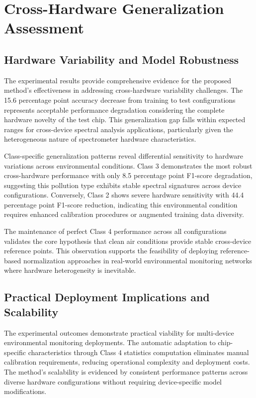 \section{Cross-Hardware Generalization Assessment}

\subsection{Hardware Variability and Model Robustness}

The experimental results provide comprehensive evidence for the proposed method's effectiveness in addressing cross-hardware variability challenges. The 15.6 percentage point accuracy decrease from training to test configurations represents acceptable performance degradation considering the complete hardware novelty of the test chip. This generalization gap falls within expected ranges for cross-device spectral analysis applications, particularly given the heterogeneous nature of spectrometer hardware characteristics.

Class-specific generalization patterns reveal differential sensitivity to hardware variations across environmental conditions. Class 3 demonstrates the most robust cross-hardware performance with only 8.5 percentage point F1-score degradation, suggesting this pollution type exhibits stable spectral signatures across device configurations. Conversely, Class 2 shows severe hardware sensitivity with 44.4 percentage point F1-score reduction, indicating this environmental condition requires enhanced calibration procedures or augmented training data diversity.

The maintenance of perfect Class 4 performance across all configurations validates the core hypothesis that clean air conditions provide stable cross-device reference points. This observation supports the feasibility of deploying reference-based normalization approaches in real-world environmental monitoring networks where hardware heterogeneity is inevitable.

\subsection{Practical Deployment Implications and Scalability}

The experimental outcomes demonstrate practical viability for multi-device environmental monitoring deployments. The automatic adaptation to chip-specific characteristics through Class 4 statistics computation eliminates manual calibration requirements, reducing operational complexity and deployment costs. The method's scalability is evidenced by consistent performance patterns across diverse hardware configurations without requiring device-specific model modifications.

